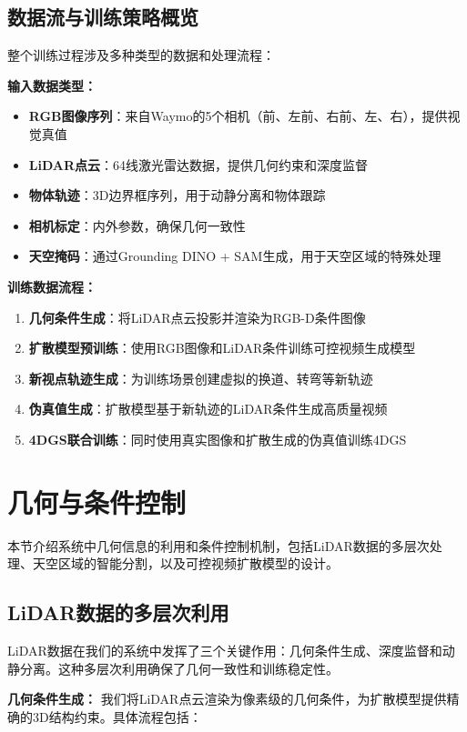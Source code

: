 \subsection{数据流与训练策略概览}

整个训练过程涉及多种类型的数据和处理流程：

\textbf{输入数据类型：}
\begin{itemize}
\item \textbf{RGB图像序列}：来自Waymo的5个相机（前、左前、右前、左、右），提供视觉真值
\item \textbf{LiDAR点云}：64线激光雷达数据，提供几何约束和深度监督
\item \textbf{物体轨迹}：3D边界框序列，用于动静分离和物体跟踪
\item \textbf{相机标定}：内外参数，确保几何一致性
\item \textbf{天空掩码}：通过Grounding DINO + SAM生成，用于天空区域的特殊处理
\end{itemize}

\textbf{训练数据流程：}
\begin{enumerate}
\item \textbf{几何条件生成}：将LiDAR点云投影并渲染为RGB-D条件图像
\item \textbf{扩散模型预训练}：使用RGB图像和LiDAR条件训练可控视频生成模型
\item \textbf{新视点轨迹生成}：为训练场景创建虚拟的换道、转弯等新轨迹
\item \textbf{伪真值生成}：扩散模型基于新轨迹的LiDAR条件生成高质量视频
\item \textbf{4DGS联合训练}：同时使用真实图像和扩散生成的伪真值训练4DGS
\end{enumerate}

\section{几何与条件控制}

本节介绍系统中几何信息的利用和条件控制机制，包括LiDAR数据的多层次处理、天空区域的智能分割，以及可控视频扩散模型的设计。

\subsection{LiDAR数据的多层次利用}

LiDAR数据在我们的系统中发挥了三个关键作用：几何条件生成、深度监督和动静分离。这种多层次利用确保了几何一致性和训练稳定性。

\textbf{几何条件生成：}
我们将LiDAR点云渲染为像素级的几何条件，为扩散模型提供精确的3D结构约束。具体流程包括：

